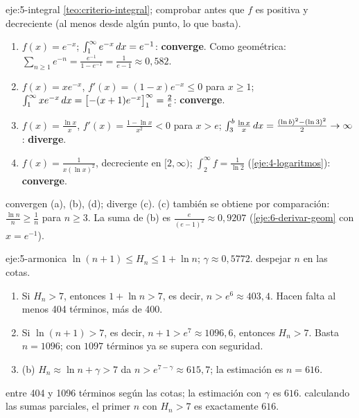 \begin{solucion}{eje:5-integral}
\planteamiento \cref{teo:criterio-integral}; comprobar antes que $f$ es positiva y decreciente (al menos desde algún punto, lo que basta).
\pasos
\begin{enumerate}[label=(\alph*)]
  \item $f(x)=e^{-x}$; $\int_1^{\infty}e^{-x}\mathop{}\!d x=e^{-1}$: \textbf{converge}. Como geométrica: $\sum_{n\ge1}e^{-n}=\frac{e^{-1}}{1-e^{-1}}=\frac{1}{e-1}\approx0{,}582$.
  \item $f(x)=xe^{-x}$, $f'(x)=(1-x)e^{-x}\le0$ para $x\ge1$; $\int_1^{\infty}xe^{-x}\mathop{}\!d x=\bigl[-(x+1)e^{-x}\bigr]_{1}^{\infty}=\frac2e$: \textbf{converge}.
  \item $f(x)=\frac{\ln x}{x}$, $f'(x)=\frac{1-\ln x}{x^{2}}<0$ para $x>e$; $\int_3^{b}\frac{\ln x}{x}\mathop{}\!d x=\frac{(\ln b)^{2}-(\ln3)^{2}}{2}\to\infty$: \textbf{diverge}.
  \item $f(x)=\frac{1}{x(\ln x)^{2}}$, decreciente en $[2,\infty)$; $\int_2^{\infty}f=\frac{1}{\ln2}$ (\cref{eje:4-logaritmos}): \textbf{converge}.
\end{enumerate}
\resultado convergen (a), (b), (d); diverge (c).
\comprobacion (c) también se obtiene por comparación: $\frac{\ln n}{n}\ge\frac1n$ para $n\ge3$. La suma de (b) es $\frac{e}{(e-1)^{2}}\approx0{,}9207$ (\cref{eje:6-derivar-geom} con $x=e^{-1}$).
\end{solucion}

\begin{solucion}{eje:5-armonica}
\datos $\ln(n+1)\le H_n\le1+\ln n$; $\gamma\approx0{,}5772$.
\planteamiento despejar $n$ en las cotas.
\pasos
\begin{enumerate}[label=\arabic*.]
  \item Si $H_n>7$, entonces $1+\ln n>7$, es decir, $n>e^{6}\approx403{,}4$. Hacen falta al menos 404 términos, más de 400.
  \item Si $\ln(n+1)>7$, es decir, $n+1>e^{7}\approx1096{,}6$, entonces $H_n>7$. Basta $n=1096$; con $1097$ términos ya se supera con seguridad.
  \item (b) $H_n\approx\ln n+\gamma>7$ da $n>e^{7-\gamma}\approx615{,}7$; la estimación es $n=616$.
\end{enumerate}
\resultado entre 404 y 1096 términos según las cotas; la estimación con $\gamma$ es $616$.
\comprobacion calculando las sumas parciales, el primer $n$ con $H_n>7$ es exactamente $616$.
\end{solucion}


